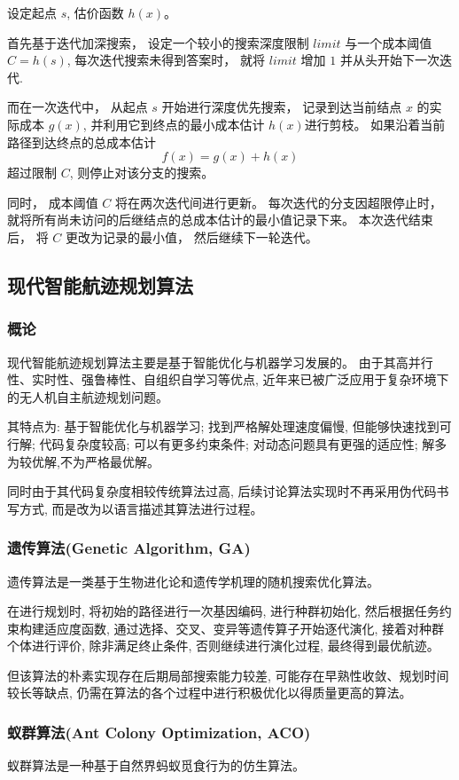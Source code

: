 \documentclass[12pt,a4paper,oneside,UTF8]{ctexart}
\begin{document}
设定起点 $s$,
估价函数 $h(x)$。

首先基于迭代加深搜索，
设定一个较小的搜索深度限制 $limit$ 与一个成本阈值 $C = h(s)$,
每次迭代搜索未得到答案时，
就将 $limit$ 增加 $1$ 并从头开始下一次迭代.

而在一次迭代中，
从起点 $s$ 开始进行深度优先搜索，
记录到达当前结点 $x$ 的实际成本 $g(x)$,
并利用它到终点的最小成本估计 $h(x)$进行剪枝。
如果沿着当前路径到达终点的总成本估计 
\[
  f(x) = g(x) +  h(x)
\]
超过限制 $C$,
则停止对该分支的搜索。

同时，
成本阈值 $C$ 将在两次迭代间进行更新。
每次迭代的分支因超限停止时，
就将所有尚未访问的后继结点的总成本估计的最小值记录下来。
本次迭代结束后，
将 $C$ 更改为记录的最小值，
然后继续下一轮迭代。

\subsection{现代智能航迹规划算法}
\subsubsection{概论}
现代智能航迹规划算法主要是基于智能优化与机器学习发展的。
由于其高并行性、实时性、强鲁棒性、自组织自学习等优点,
近年来已被广泛应用于复杂环境下的无人机自主航迹规划问题\textsuperscript{\cite{ref6}\cite{ref7}}。

其特点为:
基于智能优化与机器学习;
找到严格解处理速度偏慢,
但能够快速找到可行解;
代码复杂度较高;
可以有更多约束条件;
对动态问题具有更强的适应性;
解多为较优解,不为严格最优解。

同时由于其代码复杂度相较传统算法过高,
后续讨论算法实现时不再采用伪代码书写方式,
而是改为以语言描述其算法进行过程。
\subsubsection{遗传算法(Genetic Algorithm, GA)}
遗传算法是一类基于生物进化论和遗传学机理的随机搜索优化算法。

在进行规划时,
将初始的路径进行一次基因编码,
进行种群初始化,
然后根据任务约束构建适应度函数,
通过选择、交叉、变异等遗传算子开始逐代演化,
接着对种群个体进行评价,
除非满足终止条件,
否则继续进行演化过程,
最终得到最优航迹\textsuperscript{\cite{ref8}}。

但该算法的朴素实现存在后期局部搜索能力较差,
可能存在早熟性收敛、规划时间较长等缺点,
仍需在算法的各个过程中进行积极优化以得质量更高的算法。
\subsubsection{蚁群算法(Ant Colony Optimization, ACO)}
蚁群算法是一种基于自然界蚂蚁觅食行为的仿生算法。
\end{document}
